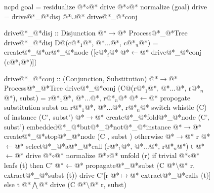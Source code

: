 \documentclass[12pt,a4paper]{report}
\begin{document}
\thispagestyle{empty}
\begin{figure}[h]
\begin{PseudoCode}[moredelim={[is][stringstyle]{@@}{@@}},
  moredelim={[is][\color{dkgreen}\bfseries]{@!}{@!}},
  moredelim={[is][\color{red}\bfseries]{!!}{!!}}]
ncpd goal = residualize @*$\circ$@* drive @*$\circ$@* normalize (goal)
drive     = drive@*\_@*disj @*$\cup$@* drive@*\_@*conj

drive@*\_@*disj :: Disjunction @*$\to$@* Process@*\_@*Tree
drive@*\_@*disj D@(c@*$_1$@*, @*$\dots$@*, c@*$_n$@*) =
  create@*\_@*or@*\_@*node ([c@*$_i$@* @*$\leftarrow$@* drive@*\_@*conj (c@*$_i$@*)])

drive@*\_@*conj :: (Conjunction, Substitution) @*$\to$@* Process@*\_@*Tree
drive@*\_@*conj (C@(r@*$_1$@*, @*$\dots$@*, r@*$_n$@*), subst) =
  r@*$_1$@*, @*$\dots$@*, r@*$_n$@* @*$\leftarrow$@* propogate substitution subst on r@*$_1$@*, @*$\dots$@*, r@*$_n$@*
  switch whistle (C) of
    instance (C', subst')      @*$\to$@* create@*\_@*fold@*\_@*node (C', subst')
    embedded@*\_@*but@*\_@*not@*\_@*instance @*$\to$@* create@*\_@*stop@*\_@*node (C , subst )
    otherwise @*$\to$@*
      r @*$\leftarrow$@* select@*\_@*a@*\_@*call (r@*$_1$@*, @*$\dots$@*, r@*$_n$@*)
      t @*$\leftarrow$@* drive @*$\circ$@* normalize @*$\circ$@* unfold (r)
      if trivial @*$\circ$@* leafs (t)
      then
        C' @*$\leftarrow$@* propagate@*\_@*subst (C @*$\setminus$@* r, extract@*\_@*subst (t))
        drive C'[r @*$\mapsto$@* extract@*\_@*calls (t)]
      else
        t @*$\bigwedge$@* drive (C @*$\setminus$@* r, subst)
\end{PseudoCode}
\end{figure}
\end{document}
